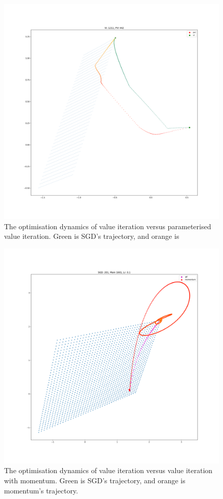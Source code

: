 \begin{figure}
\centering
\includegraphics[width=1.0\textwidth,height=0.5\textheight]{../../pictures/figures/vi-vs-pvi.png}
\caption{The optimisation dynamics of value iteration versus parameterised value iteration.
Green is SGD's trajectory, and orange is }
\label{param-compare-sgd}
\end{figure}

\begin{figure}
\centering
\includegraphics[width=1.0\textwidth,height=0.5\textheight]{../../pictures/figures/vi_sgd-vs-vi_mom_01.png}
\caption{The optimisation dynamics of value iteration versus value iteration with momentum.
Green is SGD's trajectory, and orange is momentum's trajectory.}
\label{mom-compare-sgd}
\end{figure}

